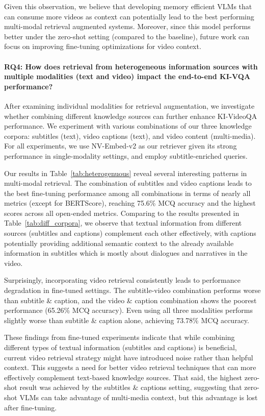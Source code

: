 Given this observation, we believe that developing memory efficient VLMs that can consume more videos as context can potentially lead to the best performing multi-modal retrieval augmented systems. Moreover, since this model performs better under the zero-shot setting (compared to the baseline), future work can focus on improving fine-tuning optimizations for video context.




\paragraph{\textbf{RQ4: How does retrieval from heterogeneous information sources with multiple modalities (text and video) impact the end-to-end KI-VQA performance?}}
After examining individual modalities for retrieval augmentation, we investigate whether combining different knowledge sources can further enhance KI-VideoQA performance. We experiment with various combinations of our three knowledge corpora: subtitles (text), video captions (text), and video content (multi-media). For all experiments, we use NV-Embed-v2 as our retriever given its strong performance in single-modality settings, and employ subtitle-enriched queries.

Our results in Table~\ref{tab:heterogenuous} reveal several interesting patterns in multi-modal retrieval. The combination of subtitles and video captions leads to the best fine-tuning performance among all combinations in terms of nearly all metrics (except for BERTScore), reaching 75.6\% MCQ accuracy and the highest scores across all open-ended metrics. Comparing to the results presented in Table~\ref{tab:diff_corpora}, we observe that textual information from different sources (subtitles and captions) complement each other effectively, with captions potentially providing additional semantic context to the already available information in subtitles which is mostly about dialogues and narratives in the video.

Surprisingly, incorporating video retrieval consistently leads to performance degradation in fine-tuned settings. The subtitle-video combination performs worse than subtitle \& caption, and the video \& caption combination  shows the poorest performance (65.26\% MCQ accuracy). Even using all three modalities performs slightly worse than subtitle \& caption alone, achieving 73.78\% MCQ accuracy. 

These findings from fine-tuned experiments indicate that while combining different types of textual information (subtitles and captions) is beneficial, current video retrieval strategy might have introduced noise rather than helpful context. This suggests a need for better video retrieval techniques that can more effectively complement text-based knowledge sources. That said, the highest zero-shot result was achieved by the subtitles \& captions setting, suggesting that zero-shot VLMs can take advantage of multi-media context, but this advantage is lost after fine-tuning.


